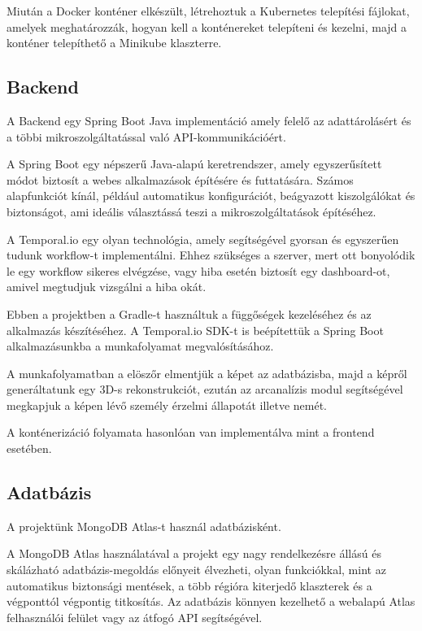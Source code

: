 \documentclass[12pt,a4]{article}
\begin{document}
            Miután a Docker konténer elkészült, létrehoztuk a Kubernetes telepítési fájlokat, amelyek meghatározzák, hogyan kell a konténereket telepíteni és kezelni, majd a konténer telepíthető a Minikube klaszterre.
            
        \subsection{Backend}

            A Backend egy Spring Boot Java implementáció amely felelő az adattárolásért és a többi mikroszolgáltatással való API-kommunikációért.

            A Spring Boot egy népszerű Java-alapú keretrendszer, amely egyszerűsített módot biztosít a webes alkalmazások építésére és futtatására. Számos alapfunkciót kínál, például automatikus konfigurációt, beágyazott kiszolgálókat és biztonságot, ami ideális választássá teszi a mikroszolgáltatások építéséhez.
            
            A Temporal.io egy olyan technológia, amely segítségével gyorsan és
        	egyszerűen tudunk workflow-t implementálni. Ehhez szükséges a szerver,
        	mert ott bonyolódik le egy workflow sikeres elvégzése, vagy hiba esetén
        	biztosít egy dashboard-ot, amivel megtudjuk vizsgálni a hiba okát. 

            Ebben a projektben a Gradle-t használtuk a függőségek kezeléséhez és az alkalmazás készítéséhez. A Temporal.io SDK-t is beépítettük a Spring Boot alkalmazásunkba a munkafolyamat megvalósításához.

            A munkafolyamatban a elöszőr elmentjük a képet az adatbázisba, majd a képről generáltatunk egy 3D-s rekonstrukciót, ezután az arcanalízis modul segítségével megkapjuk a képen lévő személy érzelmi állapotát illetve nemét.

            A konténerizáció folyamata hasonlóan van implementálva mint a frontend esetében.
         
        \subsection{Adatbázis}
            A projektünk MongoDB Atlas-t használ adatbázisként.

            A MongoDB Atlas használatával a projekt egy nagy rendelkezésre állású és skálázható adatbázis-megoldás előnyeit élvezheti, olyan funkciókkal, mint az automatikus biztonsági mentések, a több régióra kiterjedő klaszterek és a végponttól végpontig titkosítás. Az adatbázis könnyen kezelhető a webalapú Atlas felhasználói felület vagy az átfogó API segítségével. 
            
\end{document}
